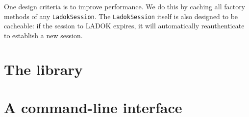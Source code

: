 \documentclass[a4paper,oneside]{book}
\begin{document}
One design criteria is to improve performance.
We do this by caching all factory methods of any \texttt{LadokSession}.
The \texttt{LadokSession} itself is also designed to be cacheable: if the session to 
LADOK expires, it will automatically reauthenticate to establish a new session.



\part{The library}





\part{A command-line interface}





\backmatter
\printbibliography
\end{document}
